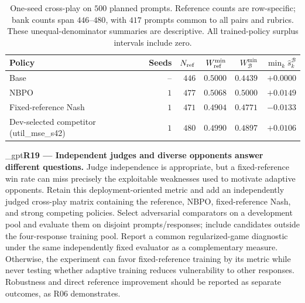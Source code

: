 \documentclass{article}
\makeatletter
\newif\ifshowreviews
\let\revieworiginalref\ref
\newcommand{\reviewref}[1]{%
  \@ifundefined{r@#1}{\textnormal{[original-draft ref.: \texttt{\detokenize{#1}}]}}%
  {\revieworiginalref{#1}}}
\let\ref\reviewref
\newcommand{\reviewresponse}[1]{%
  \ifshowreviews
  \par\begingroup\color{blue!65!black}\hypersetup{allcolors=blue!65!black}\emergencystretch=2em%
  \noindent\textbf{Response:} #1\par\endgroup
  \fi}
\theoremstyle{remark}
\theoremstyle{plain}
\makeatother
\begin{document}
\begin{table}[t]
\centering\small
\setlength{\tabcolsep}{4pt}
\caption{One-seed cross-play on $500$ planned prompts. Reference counts are row-specific; bank counts span $446$--$480$, with $417$ prompts common to all pairs and rubrics. These unequal-denominator summaries are descriptive. All trained-policy surplus intervals include zero.}
\label{tab:independent-crossplay}
\begin{tabular}{lrrrrr}
\toprule
Policy & Seeds & $N_{\rm ref}$ & $W_{\rm ref}^{\min}$ & $W_{\mathcal B}^{\min}$ & $\min_k\widehat s_k^{\mathcal B}$\\
\midrule
Base & -- & $446$ & $0.5000$ & $0.4439$ & $+0.0000$\\
NBPO & $1$ & $477$ & $0.5068$ & $0.5000$ & $+0.0149$\\
Fixed-reference Nash & $1$ & $471$ & $0.4904$ & $0.4771$ & $-0.0133$\\
Dev-selected competitor (util\_mse\_s42) & $1$ & $480$ & $0.4990$ & $0.4897$ & $+0.0106$\\
\bottomrule
\end{tabular}
\end{table}

\kekim_gpt{\textbf{R19 --- Independent judges and diverse opponents answer different questions.} Judge independence is appropriate, but a fixed-reference win rate can miss precisely the exploitable weaknesses used to motivate adaptive opponents. Retain this deployment-oriented metric and add an independently judged cross-play matrix containing the reference, NBPO, fixed-reference Nash, and strong competing policies. Select adversarial comparators on a development pool and evaluate them on disjoint prompts/responses; include candidates outside the four-response training pool. Report a common regularized-game diagnostic under the same independently fixed evaluator as a complementary measure. Otherwise, the experiment can favor fixed-reference training by its metric while never testing whether adaptive training reduces vulnerability to other responses. Robustness and direct reference improvement should be reported as separate outcomes, as R06 demonstrates.}
\reviewresponse{\textbf{R19 --- Partially addressed.} The four-policy cross-play bank and objective-wise matrices are measured. Reference wins, worst-bank wins and regularized-bank surplus are kept distinct. Table~\ref{tab:independent-crossplay} still has unequal valid denominators despite a $417$-prompt strict intersection, so paired method conclusions require recomputation. Stronger external comparators and population exploitability remain unmeasured.}
\end{document}
